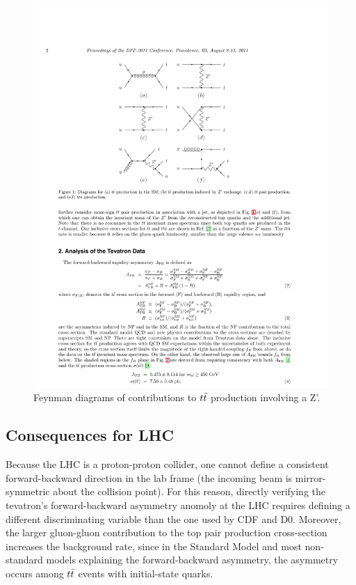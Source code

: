 \begin{figure}
  \begin{center}
    \includegraphics[width=125mm]{figures/theory/AsymmetryZPrimeModel}
  \end{center}
  \caption{Feynman diagrams of contributions to $t\bar{t}$ production involving a Z'.}
  \label{img:CDFAsymmetryMass}
\end{figure}



\subsection{Consequences for LHC}

Because the LHC is a proton-proton collider, one cannot define a consistent forward-backward direction in the lab frame (the incoming beam is mirror-symmetric about the collision point).
For this reason, directly verifying the tevatron's forward-backward asymmetry anomoly at the LHC requires defining a different discriminating variable than the one used by CDF and D0.
Moreover, the larger gluon-gluon contribution to the top pair production cross-section increases the background rate, since in the Standard Model and most non-standard models explaining the forward-backward asymmetry, the asymmetry occurs among $t\bar{t}$ events with initial-state quarks. %

